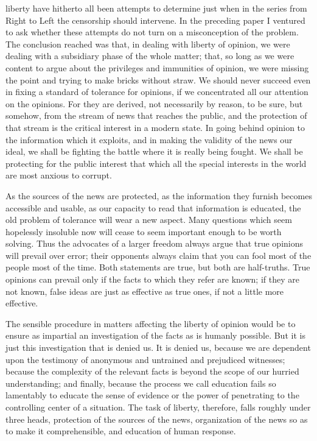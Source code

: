 \documentclass[openany,nobib,nohyper]{tufte-book}
\begin{document}
 liberty have hitherto all been attempts to determine
just when in the series from Right to Left the censorship should
intervene. In the preceding paper I ventured to ask whether these
attempts do not turn on a misconception of the problem. The conclusion
reached was that, in dealing with liberty of opinion, we were dealing
with a subsidiary phase of the whole matter; that, so long as we were
content to argue about the privileges and immunities of opinion, we were
missing the point and trying to make bricks without straw. We should
never succeed even in fixing a standard of tolerance for opinions, if we
concentrated all our attention on the opinions. For they are derived,
not necessarily by reason, to be sure, but somehow, from the stream of
news that reaches the public, and the protection of that stream is the
critical interest in a modern state. In going behind opinion to the
information which it exploits, and in making the validity of the news
our ideal, we shall be fighting the battle where it is really being
fought. We shall be protecting for the public interest that which all
the special interests in the world are most anxious to corrupt.

As the sources of the news are protected, as the information they
furnish becomes accessible and usable, as our capacity to read that
information is educated, the old problem of tolerance will wear a new
aspect. Many questions which seem hopelessly insoluble now will cease to
seem important enough to be worth solving. Thus the advocates of a
larger freedom always argue that true opinions will prevail over error;
their opponents always claim that you can fool most of the people most
of the time. Both statements are true, but both are half-truths. True
opinions can prevail only if the facts to which they refer are known; if
they are not known, false ideas are just as effective as true ones, if
not a little more effective.

The sensible procedure in matters affecting the liberty of opinion would
be to ensure as impartial an investigation of the facts as is humanly
possible. But it is just this investigation that is denied us. It is
denied us, because we are dependent upon the testimony of anonymous and
untrained and prejudiced witnesses; because the complexity of the
relevant facts is beyond the scope of our hurried understanding; and
finally, because the process we call education fails so lamentably to
educate the sense of evidence or the power of penetrating to the
controlling center of a situation. The task of liberty, therefore, falls
roughly under three heads, protection of the sources of the news,
organization of the news so as to make it comprehensible, and education
of human response.
\end{document}
